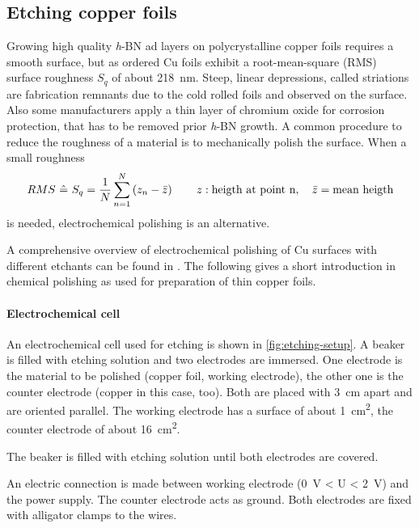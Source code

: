 \subsection{Etching copper foils}
Growing high quality \textit{h}-BN ad layers on polycrystalline copper foils requires a smooth surface, but as ordered Cu foils exhibit a root-mean-square (RMS) surface roughness $S_q$ of about \SI{218}{\nm}\cite{bin_zhang_low-temperature_2012}. Steep, linear depressions, called striations are fabrication remnants due to the cold rolled foils and observed on the surface\cite{kim_synthesis_2012-1}. Also some manufacturers apply a thin layer of chromium oxide for corrosion protection\cite{bin_zhang_low-temperature_2012}, that has to be removed prior \textit{h}-BN growth. A common procedure to reduce the roughness of a material is to mechanically polish the surface. When a small roughness $$RMS\ \hat{=}\ S_q = \frac{1}{N}\sum_{n=1}^N\left(z_n-\bar{z}\right) \qquad z: \textnormal{heigth at point n}, \quad \bar{z} = \textnormal{mean heigth}$$ is needed, electrochemical polishing is an alternative.

A comprehensive overview of  electrochemical polishing of Cu surfaces with different etchants  can be found in \cite{jinshan_electrochemical_2004}. The following gives a short introduction in chemical polishing as used for preparation of thin copper foils.\cite{antoine_polishing_1999, lilje_improved_2004, schulz_engeneering_2018}


\label{sec:etching}
\paragraph{Electrochemical cell}
An electrochemical cell used for etching is shown in \autoref{fig:etching-setup}. A beaker is filled with etching solution and two electrodes are immersed. One electrode is the material to be polished (copper foil, working electrode), the other one is the counter electrode (copper in this case, too). Both are placed with \SI{3}{\centi \meter} apart and are oriented parallel. The working electrode has a surface of about \SI{1}{\square \centi \meter}, the counter electrode of about \SI{16}{\square \centi \meter}. 

The beaker is filled with etching solution until both electrodes are covered.

An electric connection is made between working electrode (\SI{0}{\volt} < U < \SI{2}{\volt}) and the power supply. The counter electrode acts as ground. Both electrodes are fixed with alligator clamps to the wires.

